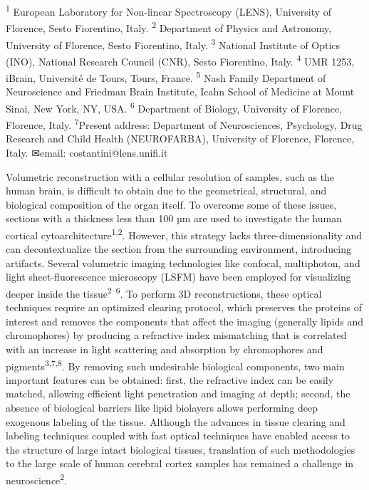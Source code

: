 \documentclass{article}
\begin{document}
\textsuperscript{1} European Laboratory for Non-linear Spectroscopy (LENS), University of Florence, Sesto Fiorentino, Italy. \textsuperscript{2} Department of Physics and Astronomy, University of Florence, Sesto Fiorentino, Italy. \textsuperscript{3} National Institute of Optics (INO), National Research Council (CNR), Sesto Fiorentino, Italy. \textsuperscript{4} UMR 1253, iBrain, Université de Tours, Tours, France. \textsuperscript{5} Nash Family Department of Neuroscience and Friedman Brain Institute, Icahn School of Medicine at Mount Sinai, New York, NY, USA. \textsuperscript{6} Department of Biology, University of Florence, Florence, Italy. \textsuperscript{7}Present address: Department of Neurosciences, Psychology, Drug Research and Child Health (NEUROFARBA), University of Florence, Florence, Italy. \textsf{✉}email: costantini@lens.unifi.it

Volumetric reconstruction with a cellular resolution of samples, such as the human brain, is difficult to obtain due to the geometrical, structural, and biological composition of the organ itself. To overcome some of these issues, sections with a thickness less than 100 µm are used to investigate the human cortical cytoarchitecture\textsuperscript{1,2}. However, this strategy lacks three-dimensionality and can decontextualize the section from the surrounding environment, introducing artifacts. Several volumetric imaging technologies like confocal, multiphoton, and light sheet-fluorescence microscopy (LSFM) have been employed for visualizing deeper inside the tissue\textsuperscript{2–6}. To perform 3D reconstructions, these optical techniques require an optimized clearing protocol, which preserves the proteins of interest and removes the components that affect the imaging (generally lipids and chromophores) by producing a refractive index mismatching that is correlated with an increase in light scattering and absorption by chromophores and pigments\textsuperscript{3,7,8}. By removing such undesirable biological components, two main important features can be obtained: first, the refractive index can be easily matched, allowing efficient light penetration and imaging at depth; second, the absence of biological barriers like lipid biolayers allows performing deep exogenous labeling of the tissue. Although the advances in tissue clearing and labeling techniques coupled with fast optical techniques have enabled access to the structure of large intact biological tissues, translation of such methodologies to the large scale of human cerebral cortex samples has remained a challenge in neuroscience\textsuperscript{2}.
\end{document}
